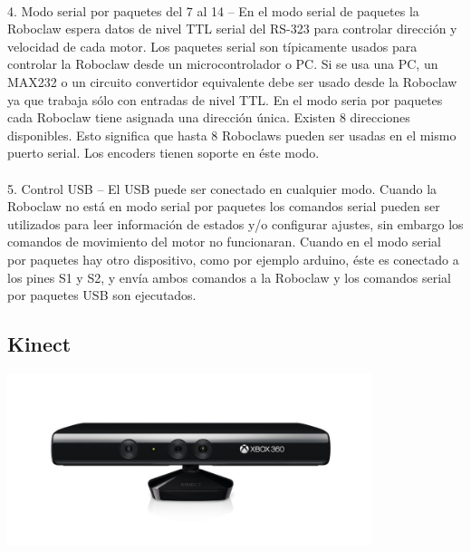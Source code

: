 \documentclass[a4paper]{book}
\begin{document}
\\
4. Modo serial por paquetes del 7 al 14 – En el modo serial de paquetes la Roboclaw espera datos de nivel TTL serial del RS-323 para controlar dirección y velocidad de cada motor. Los paquetes serial son típicamente usados para controlar la Roboclaw desde un microcontrolador o PC. Si se usa una PC, un MAX232 o un circuito convertidor equivalente debe ser usado desde la Roboclaw ya que trabaja sólo con entradas de nivel TTL. En el modo seria por paquetes cada Roboclaw tiene asignada una dirección única. Existen 8 direcciones disponibles. Esto significa que hasta 8 Roboclaws pueden ser usadas en el mismo puerto serial. Los encoders tienen soporte en éste modo.\\
\\
5. Control USB – El USB puede ser conectado en cualquier modo. Cuando la Roboclaw no está en modo serial por paquetes los comandos serial pueden ser utilizados para leer información de estados y/o configurar ajustes, sin embargo los comandos de movimiento del motor no funcionaran. Cuando en el modo serial por paquetes hay otro dispositivo, como por ejemplo arduino, éste es conectado a los pines S1 y S2, y envía ambos comandos a la Roboclaw y los comandos serial por paquetes USB son ejecutados.\\



\subsection{Kinect}

\begin{center}
\includegraphics[width=0.8\textwidth]{Figures/Hardware/Partes/Kinect.png}
\label{fig:Hardware:Partes:Kinect}
\end{center}
\end{document}
